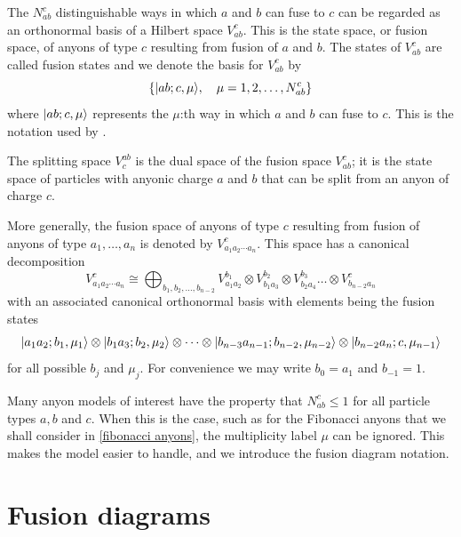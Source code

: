 The $N_{ab}^c$ distinguishable ways in which $a$ and $b$ can fuse to $c$ can be regarded as an orthonormal basis of a Hilbert space $V_{ab}^c$. This is the state space, or fusion space, of anyons of type $c$ resulting from fusion of $a$ and $b$. The states of $V_{ab}^c$ are called fusion states and we denote the basis for $V_{ab}^c$ by
\begin{equation}
  \{ \lvert ab;c,\mu\rangle, \quad \mu = 1,2,\ldots,N_{ab}^c \}
\end{equation}
where $\lvert ab;c,\mu\rangle$ represents the $\mu$:th way in which $a$ and $b$ can fuse to $c$. This is the notation used by \cite{preskill}.

The splitting space $V_c^{ab}$ is the dual space of the fusion space $V_{ab}^c$; it is the state space of particles with anyonic charge $a$ and $b$ that can be split from an anyon of charge $c$.

More generally, the fusion space of anyons of type $c$ resulting from fusion of anyons of type $a_1, \ldots, a_n$ is denoted by $V_{a_1 a_2 \cdots a_n}^c$. This space has a canonical decomposition
\begin{equation}
  V_{a_1 a_2 \cdots a_n}^c \cong \bigoplus_{b_1,b_2,\ldots,b_{n-2}} V_{a_1a_2}^{b_1} \otimes V_{b_1 a_3}^{b_2} \otimes V_{b_2 a_4}^{b_3} \ldots \otimes V_{b_{n-2} a_n}^c
\end{equation}
with an associated canonical orthonormal basis with elements being the fusion states
\begin{equation}
  \lvert a_1 a_2; b_1, \mu_1\rangle \otimes \lvert b_1 a_3; b_2, \mu_2\rangle \otimes \cdots \otimes \lvert b_{n-3} a_{n-1}; b_{n-2}, \mu_{n-2}\rangle \otimes \lvert b_{n-2} a_n; c, \mu_{n-1}\rangle
\end{equation}
for all possible $b_j$ and $\mu_j$. For convenience we may write $b_{0} = a_1$ and $b_{-1} = 1$.

Many anyon models of interest have the property that $N_{ab}^c \le 1$ for all particle types $a, b$ and $c$. When this is the case, such as for the Fibonacci anyons that we shall consider in \cref{fibonacci anyons}, the multiplicity label $\mu$ can be ignored. This makes the model easier to handle, and we introduce the fusion diagram notation.


\section{Fusion diagrams}

